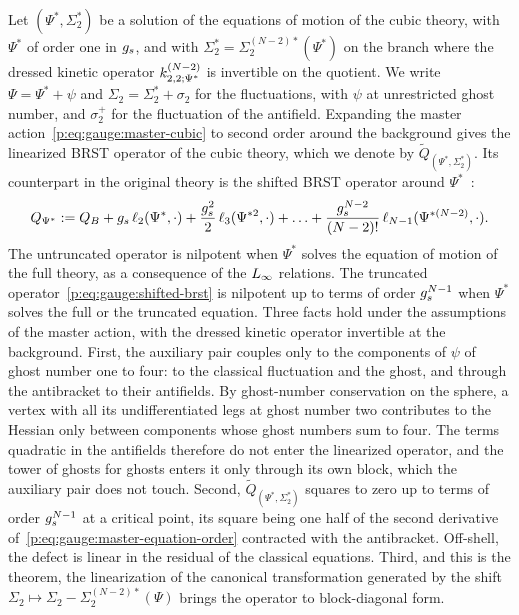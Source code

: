 Let $(\Psi^*, \Sigma_2^*)$ be a solution of the equations of motion of the cubic theory, with $\Psi^*$ of order one in $g_s$, and with $\Sigma_2^* = \Sigma_2^{(N-2)*}(\Psi^*)$ on the branch where the dressed kinetic operator $\kin{2}{\Psi^*}{N-2}$ is invertible on the quotient.
We write $\Psi = \Psi^* + \psi$ and $\Sigma_2 = \Sigma_2^* + \sigma_2$ for the fluctuations, with $\psi$ at unrestricted ghost number, and $\sigma_2^+$ for the fluctuation of the antifield.
Expanding the master action~\eqref{p:eq:gauge:master-cubic} to second order around the background gives the linearized BRST operator of the cubic theory, which we denote by $\widetilde Q_{(\Psi^*, \Sigma_2^*)}$.
Its counterpart in the original theory is the shifted BRST operator around $\Psi^*$~\cite[eq.~(4.112)]{Zwiebach:1993:ClosedStringField}:
\begin{equation}
  \label{p:eq:gauge:shifted-brst}
  Q_{\Psi^*}
    := Q_B
      + g_s \, \ell_2(\Psi^*, \cdot)
      + \frac{g_s^2}{2} \, \ell_3(\Psi^{*2}, \cdot)
      + \ldots
      + \frac{g_s^{N-2}}{(N-2)!} \, \ell_{N-1}(\Psi^{*(N-2)}, \cdot).
\end{equation}
The untruncated operator is nilpotent when $\Psi^*$ solves the equation of motion of the full theory, as a consequence of the $L_\infty$ relations.
The truncated operator~\eqref{p:eq:gauge:shifted-brst} is nilpotent up to terms of order $g_s^{N-1}$ when $\Psi^*$ solves the full or the truncated equation.
Three facts hold under the assumptions of the master action, with the dressed kinetic operator invertible at the background.
First, the auxiliary pair couples only to the components of $\psi$ of ghost number one to four: to the classical fluctuation and the ghost, and through the antibracket to their antifields.
By ghost-number conservation on the sphere, a vertex with all its undifferentiated legs at ghost number two contributes to the Hessian only between components whose ghost numbers sum to four.
The terms quadratic in the antifields therefore do not enter the linearized operator, and the tower of ghosts for ghosts enters it only through its own block, which the auxiliary pair does not touch.
Second, $\widetilde Q_{(\Psi^*, \Sigma_2^*)}$ squares to zero up to terms of order $g_s^{N-1}$ at a critical point, its square being one half of the second derivative of~\eqref{p:eq:gauge:master-equation-order} contracted with the antibracket.
Off-shell, the defect is linear in the residual of the classical equations.
Third, and this is the theorem, the linearization of the canonical transformation generated by the shift $\Sigma_2 \mapsto \Sigma_2 - \Sigma_2^{(N-2)*}(\Psi)$ brings the operator to block-diagonal form.

